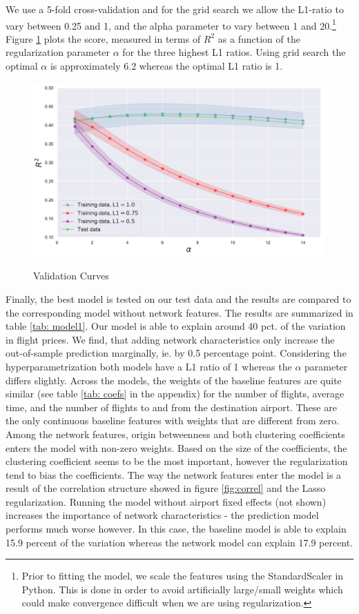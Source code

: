 We use a 5-fold cross-validation and for the grid search we allow the L1-ratio to vary between 0.25 and 1, and the alpha parameter to vary between 1 and 20.\footnote{Prior to fitting the model, we scale the features using the StandardScaler in Python. This is done in order to avoid artificially large/small weights which could make convergence difficult when we are using regularization.} 
Figure \ref{fig:validation curve} plots the score, measured in terms of $R^2$ as a function of the regularization parameter $\alpha$ for the three highest L1 ratios. Using grid search the optimal $\alpha$ is approximately 6.2 whereas the optimal L1 ratio is 1. \\ %
\begin{figure}[H]
  \centering
  \caption{Validation Curves}
    \includegraphics[width=1. \textwidth]{Exam/Figures/validation_curve.pdf}
  \label{fig:validation curve}
\end{figure}
Finally, the best model is tested on our test data and the results are compared to the corresponding model without network features. The results are summarized in table \ref{tab: model1}. Our model is able to explain around 40 pct. of the variation in flight prices. We find, that adding network characteristics only increase the out-of-sample prediction marginally, ie. by 0.5 percentage point. Considering the hyperparametrization both models have a L1 ratio of 1 whereas the $\alpha$ parameter differs slightly. Across the models, the weights of the baseline features are quite similar (see table \ref{tab: coefs} in the appendix) for the number of flights, average time, and the number of flights to and from the destination airport. These are the only continuous baseline features with weights that are different from zero. Among the network  features, origin betweenness and both clustering coefficients enters the model with non-zero weights. Based on the size of the coefficients, the clustering coefficient seems to be the most important, however the regularization tend to bias the coefficients. The way the network features enter the model is a result of the correlation structure showed in figure \ref{fig:correl} and the Lasso regularization. Running the model without airport fixed effects (not shown) increases the importance of network characteristics - the prediction model performs much worse however. In this case, the baseline model is able to explain 15.9 percent of the variation whereas the network model can explain 17.9 percent. 

